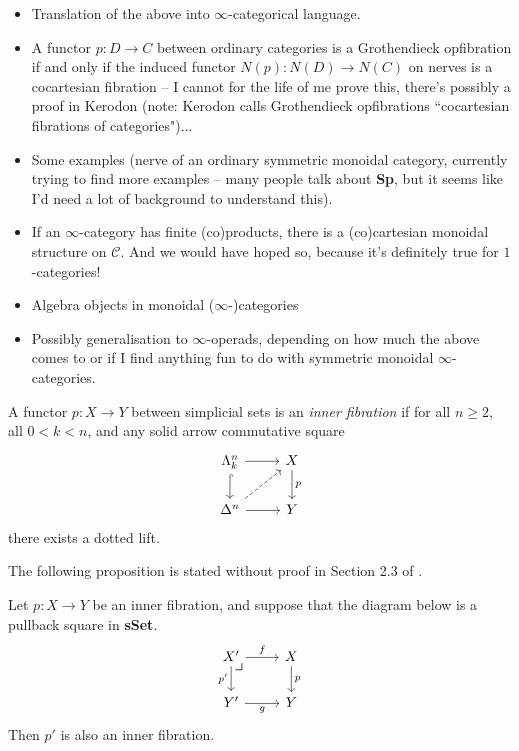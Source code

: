 \documentclass{MetricNotes2023}
\begin{document}
\begin{itemize}
\item Translation of the above into \(\infty\)-categorical language.
\item A functor \(p : D \to C\) between ordinary categories is a Grothendieck opfibration if and only if the induced functor \(N(p) : N(D) \to N(C)\) on nerves is a cocartesian fibration -- I cannot for the life of me prove this, there's possibly a proof in Kerodon (note: Kerodon calls Grothendieck opfibrations ``cocartesian fibrations of categories")...
\item Some examples (nerve of an ordinary symmetric monoidal category, currently trying to find more examples -- many people talk about \textbf{Sp}, but it seems like I'd need a lot of background to understand this).
\item If an \(\infty\)-category has finite (co)products, there is a (co)cartesian monoidal structure on \(\mathcal{C}\). And we would have hoped so, because it's definitely true for \(1\)-categories!
\item Algebra objects in monoidal (\(\infty\)-)categories
\item Possibly generalisation to \(\infty\)-operads, depending on how much the above comes to or if I find anything fun to do with symmetric monoidal \(\infty\)-categories. 
\end{itemize}

\begin{definition}
A functor \(p : X \to Y\) between simplicial sets is an \textit{inner fibration} if for all \(n \geq 2\), all \(0 < k < n\), and any solid arrow commutative square 
\[\begin{tikzcd}
\Lambda^n_k \arrow[r, ""] \arrow[d, hookrightarrow, swap, ""]  & X \arrow[d, "p"]  \\
\Delta^n \arrow[r, swap, ""] \arrow[ur, dashrightarrow, swap, ""]  & Y
\end{tikzcd}\]
there exists a dotted lift. 
\end{definition}

The following proposition is stated without proof in Section 2.3 of \autocite{lurie2008higher}.

\begin{proposition}\label{pullback}
Let \(p : X \to Y\) be an inner fibration, and suppose that the diagram below is a pullback square in \textbf{sSet}.
\[\begin{tikzcd}
X' \arrow[r, "f"] \arrow[d, swap, "p'"] \arrow[dr, phantom, "\scalebox{1.3}{$\lrcorner$}" {xshift=-16pt, yshift=10pt}] & X \arrow[d, "p"]  \\
Y' \arrow[r, swap, "g"]  & Y
\end{tikzcd}\]
Then \(p'\) is also an inner fibration. 
\end{proposition}
\end{document}
